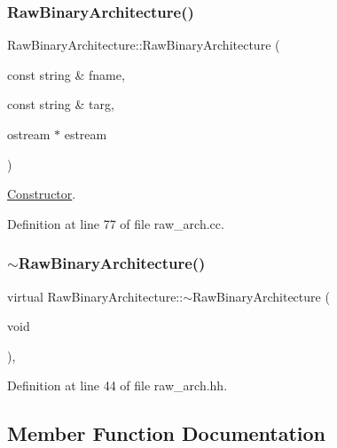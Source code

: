 \subsubsection{\texorpdfstring{RawBinaryArchitecture()}{RawBinaryArchitecture()}}
{\footnotesize\ttfamily Raw\+Binary\+Architecture\+::\+Raw\+Binary\+Architecture (\begin{DoxyParamCaption}\item[{const string \&}]{fname,  }\item[{const string \&}]{targ,  }\item[{ostream $\ast$}]{estream }\end{DoxyParamCaption})}



\mbox{\hyperlink{class_constructor}{Constructor}}. 



Definition at line 77 of file raw\+\_\+arch.\+cc.

\mbox{\label{class_raw_binary_architecture_a09070e33ef9932cf5b53de7e683e8fb2}} 
\subsubsection{\texorpdfstring{$\sim$RawBinaryArchitecture()}{~RawBinaryArchitecture()}}
{\footnotesize\ttfamily virtual Raw\+Binary\+Architecture\+::$\sim$\+Raw\+Binary\+Architecture (\begin{DoxyParamCaption}\item[{void}]{ }\end{DoxyParamCaption})\hspace{0.3cm}{\ttfamily [inline]}, {\ttfamily [virtual]}}



Definition at line 44 of file raw\+\_\+arch.\+hh.



\subsection{Member Function Documentation}
\mbox{\label{class_raw_binary_architecture_a381c8c1c048d0c8a17322ef8a17ae6ea}} 
